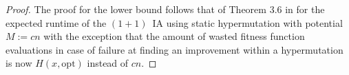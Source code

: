 \documentclass[lettersize,journal]{IEEEtran}
\begin{document}
\begin{proof}

The proof for the lower bound follows that of Theorem 3.6 in \cite{CorusOlivetoYazdaniGECCO2017} for the expected runtime of the $(1+1)$~IA %
using static hypermutation with potential $M:=cn$ with the exception that the amount of wasted fitness function evaluations in case of failure at finding an improvement within a hypermutation is now $H(x,\text{opt})$ instead of $cn$.



\end{proof}
\end{document}
